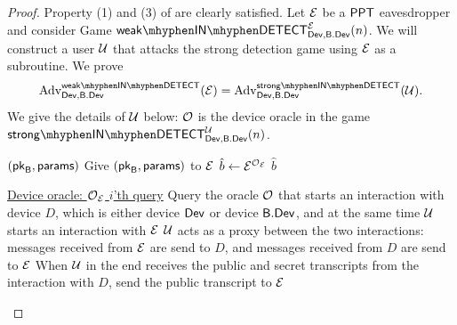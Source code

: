 \begin{proof}
Property (1) and (3) of  are clearly satisfied. Let $\mathcal{E}$ be a $\mathsf{PPT}$ eavesdropper and consider Game $\inweakdetect{\dev}{\bbdev}{\eve}$. We will construct a user $\user$ that attacks the strong detection game using $\mathcal{E}$ as a subroutine. We prove 
\begin{align}
\label{eq:1}
	\adv_{\dev,\bbdev}^{\inweakdetectplain}(\eve) = \adv_{\dev,\bbdev}^{\instrongdetectplain}(\user).
\end{align}
We give the details of $\user$ below: $\operatorname{\mathcal{O}}$ is the device oracle in the game $\instrongdetect{\dev}{\bbdev}{\user}$. 

\begin{comment}
\begin{Algorithm}[]{7cm}
\captionUser
\caption{$\user$}
\label{alg:interactiveWeakStrong}
\begin{algorithmic}[1]
\Require $(\params,\bbpk)$ 
\State Initialise list $L_{\ptrans}$
\State Make $t$ queries to $\oracle$
\State Let $L_{\ptrans}$ contain the public transcripts from the queries to $\oracle$
\State Give $\params$ and $\bbpk$ to $\eve$
\State $\hat{b}\leftarrow\eve^{\oracle_{\user}}$
\State \Ret $\hat{b}$
\Statex\hrulefill
\end{algorithmic}
\begin{algorithmic}[1]
\Statex \underline{Device oracle: \textbf{$\oracle_{\user}$} $i$'th query}
\Statex
\State Interact using public transcript $L_{\ptrans}[i]$
\end{algorithmic}
\end{Algorithm}
\end{comment}

\begin{Algorithm}[]{7cm}
\captionUser
\caption{$\user$}
\label{alg:interactiveWeakStrong}
\begin{algorithmic}[1]
\Require $(\mathsf{pk}_{\mathsf{B}},\mathsf{params})$ 
\State Give $(\mathsf{pk}_{\mathsf{B}},\mathsf{params})$ to $\mathcal{E}$
\State $\hat{b}\leftarrow\mathcal{E}^{\operatorname{\mathcal{O}}_{\mathcal{E}}}$
\State \Ret $\hat{b}$
\Statex\hrulefill
\end{algorithmic}
\begin{algorithmic}[1]
\Statex \underline{Device oracle: \textbf{$\operatorname{\mathcal{O}}_{\mathcal{E}}$} $i$'th query}
\Statex
\State Query the oracle $\operatorname{\mathcal{O}}$ that starts an interaction with device $D$, which is either device $\operatorname{\mathsf{Dev}}$ or device $\mathsf{B}.\mathsf{Dev}$, and at the same time $\user$ starts an interaction with $\mathcal{E}$
\State $\user$ acts as a proxy between the two interactions: messages received from $\mathcal{E}$ are send to $D$, and messages received from $D$ are send to $\mathcal{E}$
\State When $\user$ in the end receives the public and secret transcripts from the interaction with $D$, send the public transcript to $\mathcal{E}$
\end{algorithmic}
\end{Algorithm}


\end{proof}
